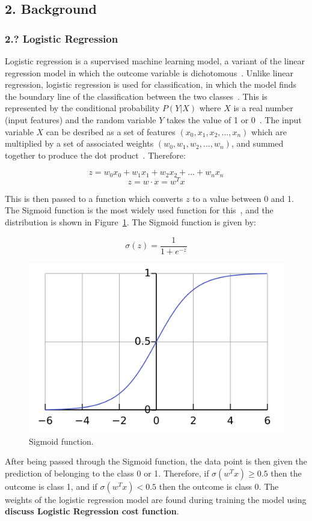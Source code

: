 \documentclass[12pt]{article}
\begin{document}
\newpage
\subsection*{2. Background}
\subsubsection*{2.? Logistic Regression}
Logistic regression is a supervised machine learning model, a variant of the linear regression model in which the outcome variable is dichotomous~\cite{Hosmer2013}. Unlike linear regression, logistic regression is used for classification, in which the model finds the boundary line of the classification between the two classes~\cite{Zou2019}. This is represented by the conditional probability \(P(Y|X)\) where \(X\) is a real number (input features) and the random variable \(Y\) takes the value of 1 or 0~\cite{Li2024}. The input variable \(X\) can be desribed as a set of features \((x_0, x_1, x_2, ..., x_n)\) which are multiplied by a set of associated weights \((w_0, w_1, w_2, ..., w_n)\), and summed together to produce the dot product~\cite{Zou2019}. Therefore:

\[z = w_{0}x_{0}+ w_{1}x_{1} + w_{2}x_{2} + ... + w_{n}x_{n}\]
\[z = w \cdot x = w^{T}x\]

This is then passed to a function which converts \(z\) to a value between 0 and 1. The Sigmoid function is the most widely used function for this~\cite{Zou2019}, and the distribution is shown in Figure~\ref{fig:sigmoid}. The Sigmoid function is given by:

\[\sigma(z) = \frac{1}{1 + e^{-z}}\]

\begin{figure} [H]
  \centering
  \includegraphics[width=0.7\linewidth]{sigmoid}
  \caption{Sigmoid function.}\label{fig:sigmoid}
\end{figure}  


After being passed through the Sigmoid function, the data point is then given the prediction of belonging to the class 0 or 1. Therefore, if \(\sigma(w^{T}x) \geq 0.5\) then the outcome is class 1, and if \(\sigma(w^{T}x) < 0.5\) then the outcome is class 0. The weights of the logistic regression model are found during training the model using \textbf{discuss Logistic Regression cost function}.
\end{document}
